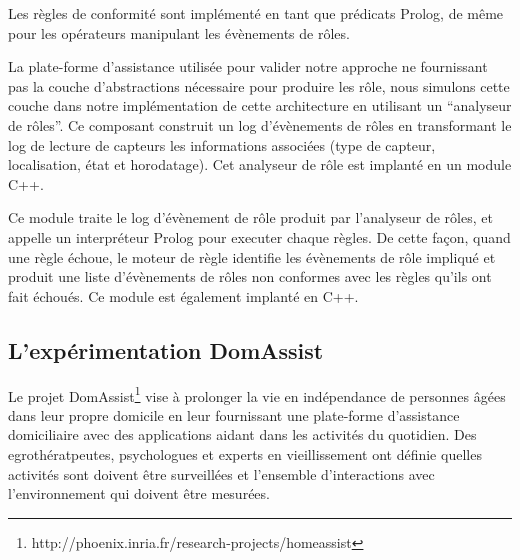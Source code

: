 
Les règles de conformité sont implémenté en tant que prédicats Prolog, de même pour les opérateurs manipulant les évènements de rôles. 

La plate-forme d'assistance utilisée pour valider notre approche ne fournissant pas la couche d'abstractions nécessaire pour produire les rôle, nous simulons cette couche dans notre implémentation de cette architecture en utilisant un ``analyseur de rôles''. Ce composant construit un log d'évènements de rôles en transformant le log de lecture de capteurs les informations associées (type de capteur, localisation, état et horodatage). Cet analyseur de rôle est implanté en un module C++.

Ce module traite le log d'évènement de rôle produit par l'analyseur de rôles, et appelle un interpréteur Prolog pour executer chaque règles. De cette façon, quand une règle échoue, le moteur de règle identifie les évènements de rôle impliqué et produit une liste d'évènements de rôles non conformes avec les règles qu'ils ont fait échoués. Ce module est également implanté en C++. 

\subsection{L'expérimentation DomAssist}\label{validation:domassist}
Le projet DomAssist\footnote{ \tiny http://phoenix.inria.fr/research-projects/homeassist} vise à prolonger la vie en indépendance de personnes âgées dans leur propre domicile en leur fournissant une plate-forme d'assistance domiciliaire avec des applications aidant dans les activités du quotidien. Des egrothératpeutes, psychologues et experts en vieillissement ont définie quelles activités sont doivent être surveillées et l'ensemble d'interactions avec l'environnement qui doivent être mesurées.

